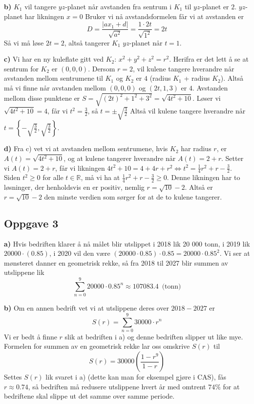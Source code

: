 \textbf{b)} $K_1$ vil tangere $yz$-planet når avstanden fra sentrum i $K_1$ til $yz$-planet er $2$. $yz$-planet har likningen $x=0$ Bruker vi nå avstandsformelen får vi at avstanden er $$D=\frac{|ax_1+d|}{\sqrt{a^2}} = \frac{1\cdot2t}{\sqrt{1^2}}=2t$$ Så vi må løse $2t=2$, altså tangerer $K_1$ $yz$-planet når $t=1$. \newline

\textbf{c)} Vi har en ny kuleflate gitt ved $K_2:\, x^2+y^2+z^2=r^2$. Herifra er det lett å se at sentrum for $K_2$ er $(0,0,0)$. Dersom $r=2$, vil kulene tangere hverandre når avstanden mellom sentrumene til $K_1$ og $K_2$ er $4$ (radius $K_1$ + radius $K_2$). Altså må vi finne når avstanden mellom $(0,0,0)$ og $(2t,1,3)$ er $4$. Avstanden mellom disse punktene er $S=\sqrt{(2t)^2+1^2+3^2}=\sqrt{4t^2+10}$. Løser vi $\sqrt{4t^2+10}=4$, får vi $t^2=\frac32$, så $t=\pm \sqrt{\frac32}$ Altså vil kulene tangere hverandre når $t=\displaystyle \left \{-\sqrt{\frac{3}{2}}, \sqrt{\frac32}\right \}$. \newline

\textbf{d)} Fra c) vet vi at avstanden mellom sentrumene, hvis $K_2$ har radius $r$, er $A(t)=\sqrt{4t^2+10}$, og at kulene tangerer hverandre når $A(t)=2+r$. Setter vi $A(t)=2+r$, får vi likningen $4t^2+10=4+4r+r^2 \Longleftrightarrow t^2 = \frac14r^2+r-\frac{3}{2}$. Siden $t^2\geq0$ for alle $t \in \mathbb{R}$, må vi ha at $\frac14r^2+r-\frac{3}{2}\geq0$. Denne likningen har to løsninger, der henholdsvis en er positiv, nemlig $r=\sqrt{10}-2$. Altså er $r=\sqrt{10}-2$ den minste verdien som sørger for at de to kulene tangerer.

\subsection{Oppgave 3}
\textbf{a)} Hvis bedriften klarer å nå målet blir utslippet i 2018 lik 20 000 tonn, i 2019 lik $20 000\cdot(0.85)$, i 2020 vil den være $(20000\cdot 0.85)\cdot 0.85 = 20000 \cdot 0.85^2$. Vi ser at mønsteret danner en geometrisk rekke, så fra 2018 til 2027 blir summen av utslippene lik $$\sum_{n=0}^9 20000\cdot 0.85^n \approx 107083.4 \, \text{ (tonn)}$$

\textbf{b)} Om en annen bedrift vet vi at utslippene deres over $2018-2027$ er $$S(r)=\sum_{n=0}^{9} 30000\cdot r^n$$ Vi er bedt å finne $r$ slik at bedriften i a) og denne bedriften slipper ut like mye. Formelen for summen av en geometrisk rekke lar oss omskrive $S(r)$ til $$S(r)=30000 \left(\frac{1-r^9}{1-r}\right)$$ Settes $S(r)$ lik svaret i a) (dette kan man for eksempel gjøre i CAS), fås $r\approx 0.74$, så bedriften må redusere utslippene hvert år med omtrent $74 \%$ for at bedriftene skal slippe ut det samme over samme periode.

